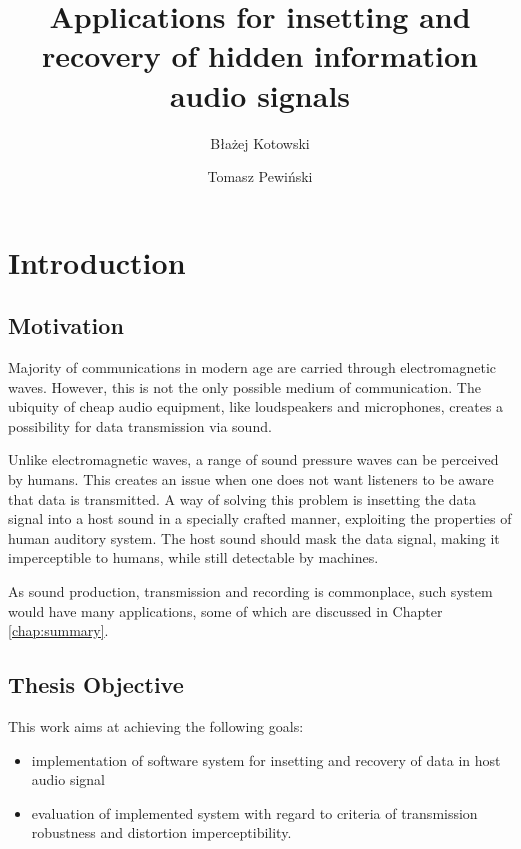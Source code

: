\documentclass[english,bachelor,a4paper,oneside]{ppfcmthesis}
\author{%
   Błażej Kotowski \album{106603} \and
   Tomasz Pewiński \album{106638}}
\title{Applications for insetting and recovery of hidden information audio signals}        %
\begin{document}
\frontmatter\pagestyle{empty}%

\maketitle\cleardoublepage

\begin{center}
\noindent{}
\end{center}
\vfill\cleardoublepage%

\pagestyle{ppfcmthesis}%
\tableofcontents* \cleardoublepage%

\mainmatter%
\chapter{Introduction}

\section{Motivation}

Majority of communications in modern age are carried through electromagnetic waves. However, this is not the only possible medium of communication.
The ubiquity of cheap audio equipment, like loudspeakers and microphones, creates a possibility for data transmission via sound.

Unlike electromagnetic waves, a range of sound pressure waves can be perceived by humans. This creates an issue when one does not want listeners to be aware that data is transmitted.
A way of solving this problem is insetting the data signal into a host sound in a specially crafted manner, exploiting the properties of human auditory system.
The host sound should mask the data signal, making it imperceptible to humans, while still detectable by machines.

As sound production, transmission and recording is commonplace, such system would have many applications, some of which are discussed in Chapter \ref{chap:summary}.

\section{Thesis Objective}

This work aims at achieving the following goals:

\begin{itemize}
  \item implementation of software system for insetting and recovery of data in host audio signal
  \item evaluation of implemented system with regard to criteria of transmission robustness and distortion imperceptibility.
\end{itemize}
\end{document}
